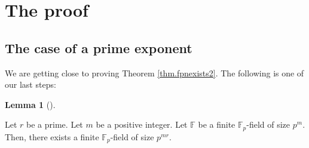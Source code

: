 \documentclass[numbers=enddot,12pt,final,onecolumn,notitlepage]{scrartcl}%
\theoremstyle{definition}
\newtheorem{lem}[theo]{Lemma}
\newenvironment{lemma}[1][]
{\begin{lem}[#1]\begin{leftbar}}
{\end{leftbar}\end{lem}}
\begin{document}
\section{The proof}

\subsection{The case of a prime exponent}

We are getting close to proving Theorem \ref{thm.fpnexists2}. The following is
one of our last steps:

\begin{lemma}
\label{lem.fpnexists-primestep}Let $r$ be a prime. Let $m$ be a positive
integer. Let $\mathbb{F}$ be a finite $\mathbb{F}_{p}$-field of size $p^{m}$.
Then, there exists a finite $\mathbb{F}_{p}$-field of size $p^{mr}$.
\end{lemma}
\end{document}
